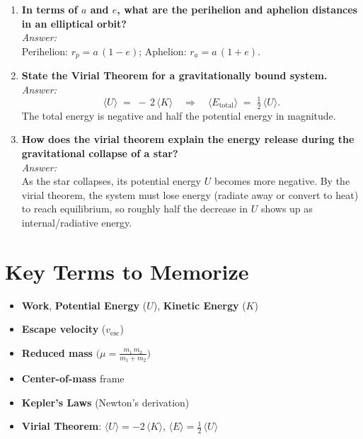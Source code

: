 \begin{enumerate}
  \item \textbf{In terms of $a$ and $e$, what are the perihelion and aphelion distances in an elliptical orbit?}\\
    \emph{Answer:}\\
    Perihelion: $r_p = a\,(1 - e)$; \quad
    Aphelion: $r_a = a\,(1 + e)$.

  \item \textbf{State the Virial Theorem for a gravitationally bound system.}\\
    \emph{Answer:}\\
    \[
      \langle U\rangle
      \;=\;
      -\,2\,\langle K\rangle
      \quad\Longrightarrow\quad
      \langle E_{\mathrm{total}}\rangle
      \;=\;
      \tfrac12\,\langle U\rangle.
    \]
    The total energy is negative and half the potential energy in magnitude.

  \item \textbf{How does the virial theorem explain the energy release during the gravitational collapse of a star?}\\
    \emph{Answer:}\\
    As the star collapses, its potential energy $U$ becomes more negative. By the virial theorem, the system must lose energy (radiate away or convert to heat) to reach equilibrium, so roughly half the decrease in $U$ shows up as internal/radiative energy.
\end{enumerate}

\section{Key Terms to Memorize}

\begin{itemize}
  \item \textbf{Work}, \textbf{Potential Energy} ($U$), \textbf{Kinetic Energy} ($K$)
  \item \textbf{Escape velocity} ($v_{\text{esc}}$)
  \item \textbf{Reduced mass} $\bigl(\mu = \frac{m_1\,m_2}{m_1 + m_2}\bigr)$
  \item \textbf{Center-of-mass} frame
  \item \textbf{Kepler’s Laws} (Newton’s derivation)
  \item \textbf{Virial Theorem}: $\langle U\rangle = -2\,\langle K\rangle$, $\langle E\rangle = \tfrac12\,\langle U\rangle$
\end{itemize}







